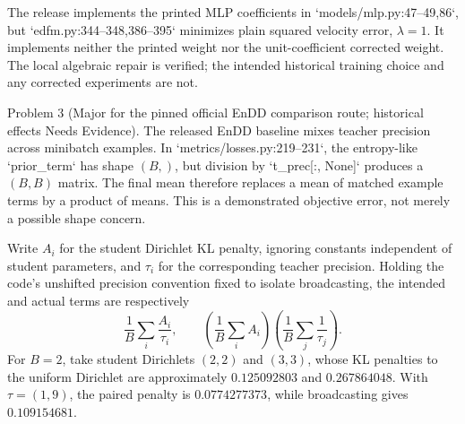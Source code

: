 \documentclass[10pt]{article}
\begin{document}
The release implements the printed MLP coefficients in `models/mlp.py:47--49,86`, but `edfm.py:344--348,386--395` minimizes plain squared velocity error, \(\lambda=1\). It implements neither the printed weight nor the unit-coefficient corrected weight. The local algebraic repair is verified; the intended historical training choice and any corrected experiments are not.\par
Problem 3 (Major for the pinned official EnDD comparison route; historical effects Needs Evidence).  The released EnDD baseline mixes teacher precision across minibatch examples. In `metrics/losses.py:219--231`, the entropy-like `prior\_term` has shape \((B,)\), but division by `t\_prec[:, None]` produces a \((B,B)\) matrix. The final mean therefore replaces a mean of matched example terms by a product of means. This is a demonstrated objective error, not merely a possible shape concern.\par
Write \(A_i\) for the student Dirichlet KL penalty, ignoring constants independent of student parameters, and \(\tau_i\) for the corresponding teacher precision. Holding the code’s unshifted precision convention fixed to isolate broadcasting, the intended and actual terms are respectively \[\frac1B\sum_i\frac{A_i}{\tau_i},
 \qquad
 \left(\frac1B\sum_iA_i\right)
 \left(\frac1B\sum_j\frac1{\tau_j}\right).\] For \(B=2\), take student Dirichlets \((2,2)\) and \((3,3)\), whose KL penalties to the uniform Dirichlet are approximately \(0.125092803\) and \(0.267864048\). With \(\tau=(1,9)\), the paired penalty is \(0.0774277373\), while broadcasting gives \(0.109154681\).\par
\end{document}
